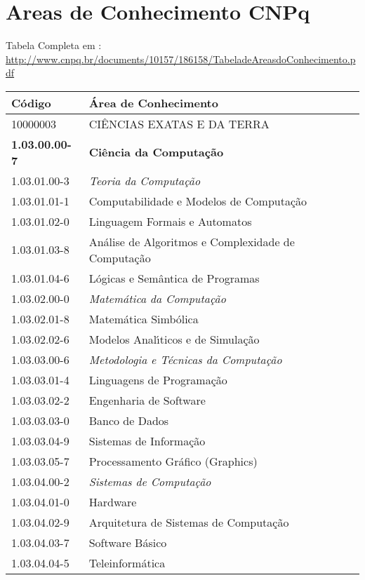 






\chapter{Areas de Conhecimento CNPq}

Tabela Completa em :\\
 \url{http://www.cnpq.br/documents/10157/186158/TabeladeAreasdoConhecimento.pdf}

\begin{tabular}{ll}
  \hline
 \textbf{ C\'{o}digo} & \textbf{\'{A}rea de Conhecimento} \\
    \hline     \hline
  10000003 & CI\^{E}NCIAS EXATAS E DA TERRA \\
    \hline
  \textbf{1.03.00.00-7}	& \textbf{Ci\^{e}ncia da Computa\c{c}\~{a}o} \\
      \hline
1.03.01.00-3	& \textit{Teoria da Computa\c{c}\~{a}o}\\
    \hline
1.03.01.01-1	& 	Computabilidade e Modelos de Computa\c{c}\~{a}o\\
1.03.01.02-0	& 	Linguagem Formais e Automatos\\
1.03.01.03-8	& 	An\'{a}lise de Algoritmos e Complexidade de Computa\c{c}\~{a}o\\
1.03.01.04-6	& 	L\'{o}gicas e Sem\^{a}ntica de Programas\\
    \hline
1.03.02.00-0	& 	\textit{Matem\'{a}tica da Computa\c{c}\~{a}o}\\
    \hline
1.03.02.01-8	& 	Matem\'{a}tica Simb\'{o}lica\\
1.03.02.02-6	& 	Modelos Anal\'{\i}ticos e de Simula\c{c}\~{a}o\\
    \hline
1.03.03.00-6	& 	\textit{Metodologia e T\'{e}cnicas da Computa\c{c}\~{a}o}\\
    \hline
1.03.03.01-4	& 	Linguagens de Programa\c{c}\~{a}o\\
1.03.03.02-2	& 	Engenharia de Software\\
1.03.03.03-0	& 	Banco de Dados\\
1.03.03.04-9	& 	Sistemas de Informa\c{c}\~{a}o\\
1.03.03.05-7	& 	Processamento Gr\'{a}fico (Graphics)\\
    \hline
1.03.04.00-2	& 	\textit{Sistemas de Computa\c{c}\~{a}o}\\
    \hline
1.03.04.01-0	& 	Hardware\\
1.03.04.02-9	& 	Arquitetura de Sistemas de Computa\c{c}\~{a}o\\
1.03.04.03-7	&	Software B\'{a}sico\\
1.03.04.04-5	&	Teleinform\'{a}tica\\
  \hline
\end{tabular}
